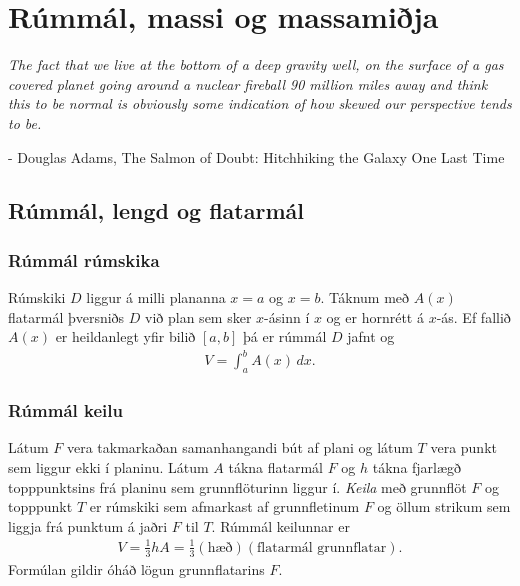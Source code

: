 \documentclass[b5paper,11pt,icelandic]{sphinxmanual}
\begin{document}
\chapter{Rúmmál, massi og massamiðja}
\label{kafli07:rummal-massi-og-massamija}\label{kafli07::doc}
\emph{The fact that we live at the bottom of a deep gravity well, on the surface of a
gas covered planet going around a nuclear fireball 90 million miles away and think
this to be normal is obviously some indication of how skewed our perspective tends to be.}

- Douglas Adams, The Salmon of Doubt: Hitchhiking the Galaxy One Last Time


\section{Rúmmál, lengd og flatarmál}
\label{kafli07:rummal-lengd-og-flatarmal}\label{kafli07:index-1}

\subsection{Rúmmál rúmskika}
\label{kafli07:rummal-rumskika}
Rúmskiki \(D\) liggur á milli plananna \(x=a\) og \(x=b\).
Táknum með \(A(x)\) flatarmál þversniðs \(D\) við plan sem sker
\(x\)-ásinn í \(x\) og er hornrétt á \(x\)-ás. Ef fallið
\(A(x)\) er heildanlegt yfir bilið \([a, b]\) þá er rúmmál
\(D\) jafnt og
\begin{equation*}
\begin{split}V=\int_a^b A(x)\,dx.\end{split}
\end{equation*}

\subsection{Rúmmál keilu}
\label{kafli07:rummal-keilu}\label{kafli07:index-2}
Látum \(F\) vera takmarkaðan samanhangandi bút af plani og látum
\(T\) vera punkt sem liggur ekki í planinu. Látum \(A\) tákna
flatarmál \(F\) og \(h\) tákna fjarlægð topppunktsins frá
planinu sem grunnflöturinn liggur í. \textit{Keila} með grunnflöt \(F\) og
topppunkt \(T\) er rúmskiki sem afmarkast af grunnfletinum \(F\)
og öllum strikum sem liggja frá punktum á jaðri \(F\) til \(T\).
Rúmmál keilunnar er
\begin{equation*}
\begin{split}V=\frac{1}{3}hA=\frac{1}{3}(\mbox{hæð})(\mbox{flatarmál
grunnflatar}).\end{split}
\end{equation*}
Formúlan gildir óháð lögun grunnflatarins \(F\).
\end{document}
